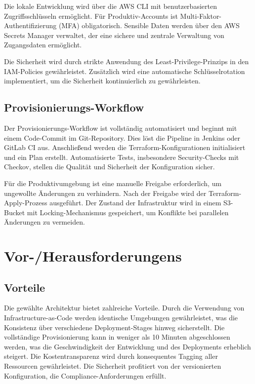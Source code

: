 Die lokale Entwicklung wird über die AWS CLI mit benutzerbasierten Zugriffsschlüsseln ermöglicht. 
Für Produktiv-Accounts ist Multi-Faktor-Authentifizierung (MFA) obligatorisch. Sensible Daten 
werden über den AWS Secrets Manager verwaltet, der eine sichere und zentrale Verwaltung von 
Zugangsdaten ermöglicht.

Die Sicherheit wird durch strikte Anwendung des Least-Privilege-Prinzips in den IAM-Policies 
gewährleistet. Zusätzlich wird eine automatische Schlüsselrotation implementiert, um die 
Sicherheit kontinuierlich zu gewährleisten.

\subsection{Provisionierungs-Workflow}
Der Provisionierungs-Workflow ist vollständig automatisiert und beginnt mit einem Code-Commit 
im Git-Repository. Dies löst die Pipeline in Jenkins oder GitLab CI aus. Anschließend werden 
die Terraform-Konfigurationen initialisiert und ein Plan erstellt. Automatisierte Tests, 
insbesondere Security-Checks mit Checkov, stellen die Qualität und Sicherheit der Konfiguration 
sicher.

Für die Produktivumgebung ist eine manuelle Freigabe erforderlich, um ungewollte Änderungen 
zu verhindern. Nach der Freigabe wird der Terraform-Apply-Prozess ausgeführt. Der Zustand 
der Infrastruktur wird in einem S3-Bucket mit Locking-Mechanismus gespeichert, um 
Konflikte bei parallelen Änderungen zu vermeiden.

\section{Vor-/Herausforderungens}
\subsection{Vorteile}
Die gewählte Architektur bietet zahlreiche Vorteile. Durch die Verwendung von Infrastructure-as-Code 
werden identische Umgebungen gewährleistet, was die Konsistenz über verschiedene Deployment-Stages 
hinweg sicherstellt. Die vollständige Provisionierung kann in weniger als 10 Minuten abgeschlossen 
werden, was die Geschwindigkeit der Entwicklung und des Deployments erheblich steigert. Die 
Kostentransparenz wird durch konsequentes Tagging aller Ressourcen gewährleistet. Die Sicherheit 
profitiert von der versionierten Konfiguration, die Compliance-Anforderungen erfüllt.

